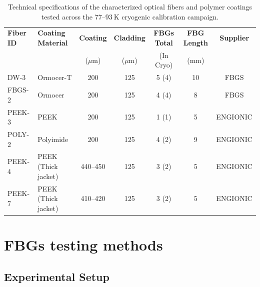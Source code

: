 \documentclass[preprint,11pt]{elsarticle}
\begin{document}
\begin{table}[htpb]
    \centering
    \scriptsize
    \setlength{\tabcolsep}{4pt}
    \caption{Technical specifications of the characterized optical fibers and polymer coatings tested across the $77$--$93~\text{K}$ cryogenic calibration campaign.}
    \label{tab:fiber_specs}
    \begin{tabular}{llccccc}
        \toprule
        \textbf{Fiber ID} & \textbf{Coating Material} & \textbf{Coating} & \textbf{Cladding} & \textbf{FBGs Total} & \textbf{FBG Length} & \textbf{Supplier} \\
                          &                            & ($\mu\text{m}$)  & ($\mu\text{m}$)   & (In Cryo)           & (mm)                &                   \\
        \midrule
        DW-3              & Ormocer-T                  & 200              & 125               & 5 (4)               & 10                  & FBGS              \\
        FBGS-2            & Ormocer                    & 200              & 125               & 4 (4)               & 8                   & FBGS              \\
        PEEK-3            & PEEK                       & 200              & 125               & 1 (1)               & 5                   & ENGIONIC          \\
        POLY-2            & Polyimide                  & 200              & 125               & 4 (2)               & 9                   & ENGIONIC          \\
        PEEK-4            & PEEK (Thick jacket)        & 440--450         & 125               & 3 (2)               & 5                   & ENGIONIC          \\
        PEEK-7            & PEEK (Thick jacket)        & 410--420         & 125               & 3 (2)               & 5                   & ENGIONIC          \\
        \bottomrule
    \end{tabular}
\end{table}


\section{FBGs testing methods}
\label{sec:setup}

\subsection{Experimental Setup}
\label{subsec:setup}
\end{document}

